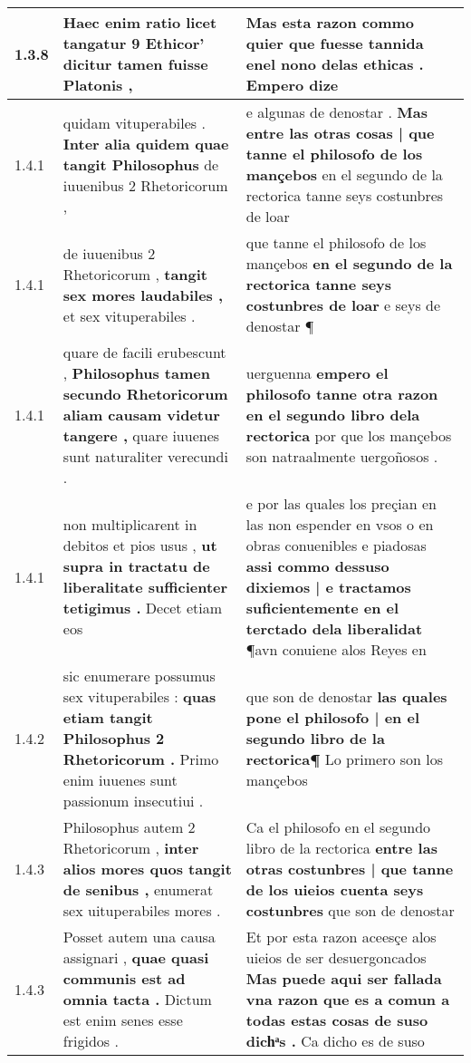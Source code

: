 \begin{tabular}{|p{1cm}|p{6.5cm}|p{6.5cm}|}
1.3.8 & Haec enim ratio licet \textbf{ tangatur 9 Ethicor’ } dicitur tamen fuisse Platonis , & Mas esta razon commo quier que fuesse tannida \textbf{ enel nono delas ethicas . } Empero dize \\\hline
1.4.1 & quidam vituperabiles . \textbf{ Inter alia quidem quae tangit Philosophus } de iuuenibus 2 Rhetoricorum , & e algunas de denostar . \textbf{ Mas entre las otras cosas | que tanne el philosofo de los mançebos } en el segundo de la rectorica tanne seys costunbres de loar \\\hline
1.4.1 & de iuuenibus 2 Rhetoricorum , \textbf{ tangit sex mores laudabiles , } et sex vituperabiles . & que tanne el philosofo de los mançebos \textbf{ en el segundo de la rectorica tanne seys costunbres de loar } e seys de denostar ¶ \\\hline
1.4.1 & quare de facili erubescunt , \textbf{ Philosophus tamen secundo Rhetoricorum aliam causam videtur tangere , } quare iuuenes sunt naturaliter verecundi . & uerguenna \textbf{ empero el philosofo tanne otra razon en el segundo libro dela rectorica } por que los mançebos son natraalmente uergoñosos . \\\hline
1.4.1 & non multiplicarent in debitos et pios usus , \textbf{ ut supra in tractatu de liberalitate sufficienter tetigimus . } Decet etiam eos & e por las quales los preçian en las non espender en vsos o en obras conuenibles e piadosas \textbf{ assi commo dessuso dixiemos | e tractamos suficientemente en el terctado dela liberalidat } ¶avn conuiene alos Reyes en \\\hline
1.4.2 & sic enumerare possumus sex vituperabiles : \textbf{ quas etiam tangit Philosophus 2 Rhetoricorum . } Primo enim iuuenes sunt passionum insecutiui . & que son de denostar \textbf{ las quales pone el philosofo | en el segundo libro de la rectorica¶ } Lo primero son los mançebos \\\hline
1.4.3 & Philosophus autem 2 Rhetoricorum , \textbf{ inter alios mores quos tangit de senibus , } enumerat sex uituperabiles mores . & Ca el philosofo en el segundo libro de la rectorica \textbf{ entre las otras costunbres | que tanne de los uieios cuenta seys costunbres } que son de denostar \\\hline
1.4.3 & Posset autem una causa assignari , \textbf{ quae quasi communis est ad omnia tacta . } Dictum est enim senes esse frigidos . & Et por esta razon aceesçe alos uieios de ser desuergoncados \textbf{ Mas puede aqui ser fallada vna razon que es a comun a todas estas cosas de suso dichͣs . } Ca dicho es de suso \\\hline

\end{tabular}
